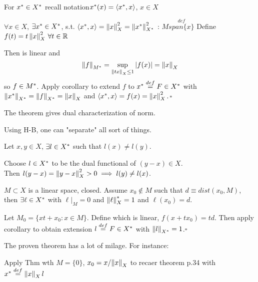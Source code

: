 For ${x}^*\in {X}^*$ recall notation$ {x}^*(x)=\left<{{x}^*},{x}\right>$, $x\in X$
\begin{theorem}
    $\forall x \in  X$, $\exists {x}^* \in {X}^*$, s.t. $\left<{{x}^*},{x}\right>=\left\|{x}\right\|_X^2=\left\|{{x}^*}\right\|_{{X}^*}^2$
    \prf:
    $M\stackrel{def}{span\{x\}}$ Define
  $f(t)=t\left\|{x}\right\|^2_X\,\forall t\in \mathbb{R}$

    Then  is linear and 
    $$
    \left\|{f}\right\|_{{M}^*}=\sup_{\left\|{tx}\right\|_X\leq 1}|f(x)|=\left\|{x}\right\|_X
    $$
    so $f\in {M}^*$. Apply corollary to extend $f$ to ${x}^*\stackrel{def}{=}F\in {X}^*$ with $\left\|{{x}^*}\right\|_{{X}^*}=\left\|{f}\right\|_{{X}^*}=\left\|{x}\right\|_X$ and $\left<{{x}^*},{x}\right>=f(x)=\left\|{x}\right\|^2_X. $$\square$

\end{theorem}
\begin{remark}
    The theorem gives dual characterization of norm.
\end{remark}

Using H-B, one can "separate" all sort of things.

\begin{proposition}\rm\nextline
	Let  $x,y\in X$, $\exists l\in{X}^*$ such that $l(x)\neq l(y)$.
	\begin{pf}{}{}
		Choose $l\in {X}^*$ to be the dual functional of $(y-x)\in X$. \\Then $l(y-x)=\left\|{y-x}\right\|^2_X>0\implies l(y)\neq l(x)$.
	\end{pf}
\end{proposition}



\begin{proposition}\rm\nextline
    $M\subset X$ is a linear space, closed. Assume $x_0\not\in M$ such that $d\equiv dist(x_0,M)$, then $\exists \ell\in{X}^*$ with $\ell|_M=0$ and $\left\|{\ell}\right\|_{X}^*=1$ and $\ell(x_0)=d$.
    \begin{pf}{}{}
        Let $M_0=\{xt+x_0:x\in M\}$. Define  which is linear, $f(x+tx_0)=td$. Then apply corollary to obtain extension $l\stackrel{def}{=}F\in {X}^*$ with $\left\|{l}\right\|_{{X}^*}=1$.$\square$
    \end{pf}
    \end{proposition}

    The proven theorem has a lot of milage. For instance:
    \begin{corollary}\rm\nextline
        Apply Thm wth $M=\{0\}$, $x_0=x/{\left\|{x}\right\|_X}$ to recaer theorem p.34 with ${x}^*\stackrel{def}{=}\left\|{x}\right\|_Xl$
    \end{corollary}

